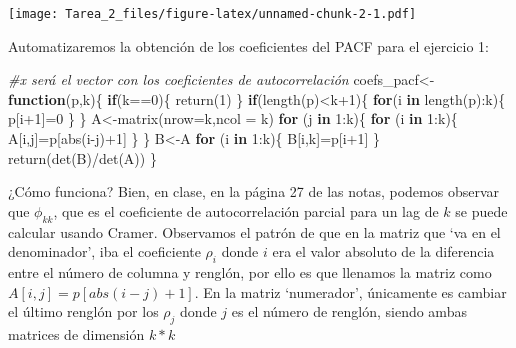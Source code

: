 \documentclass[
]{article}
\newenvironment{Shaded}{\begin{snugshade}}{\end{snugshade}}
\newcommand{\AttributeTok}[1]{\textcolor[rgb]{0.77,0.63,0.00}{#1}}
\newcommand{\CommentTok}[1]{\textcolor[rgb]{0.56,0.35,0.01}{\textit{#1}}}
\newcommand{\ControlFlowTok}[1]{\textcolor[rgb]{0.13,0.29,0.53}{\textbf{#1}}}
\newcommand{\DecValTok}[1]{\textcolor[rgb]{0.00,0.00,0.81}{#1}}
\newcommand{\FunctionTok}[1]{\textcolor[rgb]{0.00,0.00,0.00}{#1}}
\newcommand{\NormalTok}[1]{#1}
\newcommand{\OtherTok}[1]{\textcolor[rgb]{0.56,0.35,0.01}{#1}}
\newcommand{\SpecialCharTok}[1]{\textcolor[rgb]{0.00,0.00,0.00}{#1}}
\begin{document}
\texttt{[image: Tarea\_2\_files/figure-latex/unnamed-chunk-2-1.pdf]}

Automatizaremos la obtención de los coeficientes del PACF para el
ejercicio 1:

\begin{Shaded}
\begin{Highlighting}[]
\CommentTok{\#x será el vector con los coeficientes de autocorrelación}
\NormalTok{coefs\_pacf}\OtherTok{\textless{}{-}}\ControlFlowTok{function}\NormalTok{(p,k)\{}
  \ControlFlowTok{if}\NormalTok{(k}\SpecialCharTok{==}\DecValTok{0}\NormalTok{)\{}
    \FunctionTok{return}\NormalTok{(}\DecValTok{1}\NormalTok{)}
\NormalTok{  \}}
  \ControlFlowTok{if}\NormalTok{(}\FunctionTok{length}\NormalTok{(p)}\SpecialCharTok{\textless{}}\NormalTok{k}\SpecialCharTok{+}\DecValTok{1}\NormalTok{)\{}
    \ControlFlowTok{for}\NormalTok{(i }\ControlFlowTok{in} \FunctionTok{length}\NormalTok{(p)}\SpecialCharTok{:}\NormalTok{k)\{}
\NormalTok{      p[i}\SpecialCharTok{+}\DecValTok{1}\NormalTok{]}\OtherTok{=}\DecValTok{0}
\NormalTok{    \}}
\NormalTok{  \}}
\NormalTok{  A}\OtherTok{\textless{}{-}}\FunctionTok{matrix}\NormalTok{(}\AttributeTok{nrow=}\NormalTok{k,}\AttributeTok{ncol =}\NormalTok{ k)}
  \ControlFlowTok{for}\NormalTok{ (j }\ControlFlowTok{in} \DecValTok{1}\SpecialCharTok{:}\NormalTok{k)\{}
    \ControlFlowTok{for}\NormalTok{ (i }\ControlFlowTok{in} \DecValTok{1}\SpecialCharTok{:}\NormalTok{k)\{}
\NormalTok{       A[i,j]}\OtherTok{=}\NormalTok{p[}\FunctionTok{abs}\NormalTok{(i}\SpecialCharTok{{-}}\NormalTok{j)}\SpecialCharTok{+}\DecValTok{1}\NormalTok{]}
\NormalTok{    \}}
\NormalTok{  \}}
\NormalTok{  B}\OtherTok{\textless{}{-}}\NormalTok{A}
  \ControlFlowTok{for}\NormalTok{ (i }\ControlFlowTok{in} \DecValTok{1}\SpecialCharTok{:}\NormalTok{k)\{}
\NormalTok{    B[i,k]}\OtherTok{=}\NormalTok{p[i}\SpecialCharTok{+}\DecValTok{1}\NormalTok{]}
\NormalTok{  \}}
  \FunctionTok{return}\NormalTok{(}\FunctionTok{det}\NormalTok{(B)}\SpecialCharTok{/}\FunctionTok{det}\NormalTok{(A))}
\NormalTok{\}}
\end{Highlighting}
\end{Shaded}

¿Cómo funciona? Bien, en clase, en la página 27 de las notas, podemos
observar que \(\phi_{kk}\), que es el coeficiente de autocorrelación
parcial para un lag de \(k\) se puede calcular usando Cramer. Observamos
el patrón de que en la matriz que `va en el denominador', iba el
coeficiente \(\rho_{i}\) donde \(i\) era el valor absoluto de la
diferencia entre el número de columna y renglón, por ello es que
llenamos la matriz como \(A[i,j]=p[abs(i-j)+1]\). En la matriz
`numerador', únicamente es cambiar el último renglón por los \(\rho_j\)
donde \(j\) es el número de renglón, siendo ambas matrices de dimensión
\(k*k\)
\end{document}
